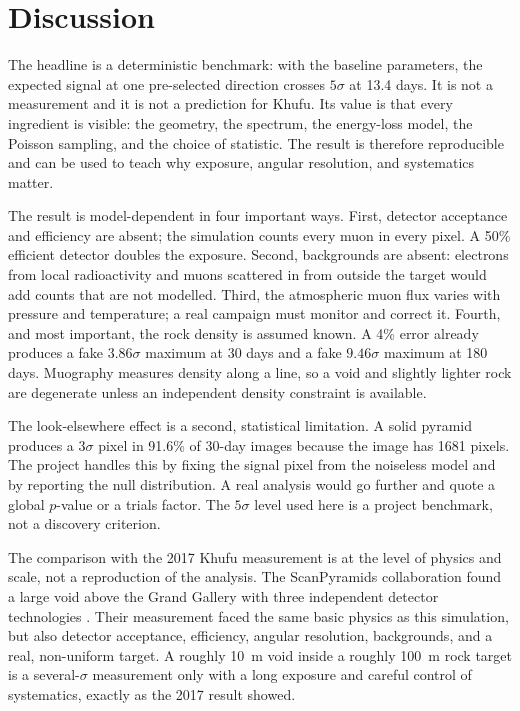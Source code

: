 \documentclass{article}
\begin{document}
\section{Discussion}
\label{sec:discussion}

The headline is a deterministic benchmark: with the baseline parameters, the
expected signal at one pre-selected direction crosses $5\sigma$ at 13.4 days.
It is not a measurement and it is not a prediction for Khufu. Its value is that
every ingredient is visible: the geometry, the spectrum, the energy-loss model,
the Poisson sampling, and the choice of statistic. The result is therefore
reproducible and can be used to teach why exposure, angular resolution, and
systematics matter.

The result is model-dependent in four important ways. First, detector
acceptance and efficiency are absent; the simulation counts every muon in every
pixel. A 50\% efficient detector doubles the exposure. Second, backgrounds are
absent: electrons from local radioactivity and muons scattered in from outside
the target would add counts that are not modelled. Third, the atmospheric muon
flux varies with pressure and temperature; a real campaign must monitor and
correct it. Fourth, and most important, the rock density is assumed known. A
4\% error already produces a fake $3.86\sigma$ maximum at 30 days and a fake
$9.46\sigma$ maximum at 180 days. Muography measures density along a line, so a
void and slightly lighter rock are degenerate unless an independent density
constraint is available.

The look-elsewhere effect is a second, statistical limitation. A solid pyramid
produces a $3\sigma$ pixel in 91.6\% of 30-day images because the image has
1681 pixels. The project handles this by fixing the signal pixel from the
noiseless model and by reporting the null distribution. A real analysis would
go further and quote a global $p$-value or a trials factor. The $5\sigma$ level
used here is a project benchmark, not a discovery criterion.

The comparison with the 2017 Khufu measurement is at the level of physics and
scale, not a reproduction of the analysis. The ScanPyramids collaboration found
a large void above the Grand Gallery with three independent detector
technologies \cite{morishima2017}. Their measurement faced the same basic
physics as this simulation, but also detector acceptance, efficiency, angular
resolution, backgrounds, and a real, non-uniform target. A roughly 10~m void
inside a roughly 100~m rock target is a several-$\sigma$ measurement only with
a long exposure and careful control of systematics, exactly as the 2017 result
showed.
\end{document}

